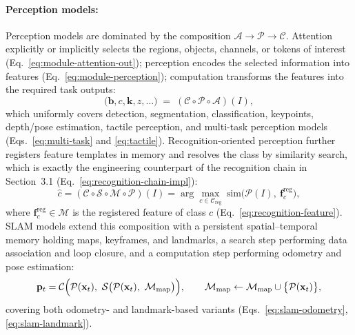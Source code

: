 \documentclass[12pt,a4paper]{article}
\newcommand{\Attn}{\mathcal{A}}
\newcommand{\Per}{\mathcal{P}}
\newcommand{\Mem}{\mathcal{M}}
\newcommand{\Srch}{\mathcal{S}}
\newcommand{\Comp}{\mathcal{C}}
\begin{document}
\paragraph{Perception models:}
Perception models are dominated by the composition $\Attn\to\Per\to\Comp$. Attention explicitly or implicitly selects the regions, objects, channels, or tokens of interest (Eq.~\eqref{eq:module-attention-out}); perception encodes the selected information into features (Eq.~\eqref{eq:module-perception}); computation transforms the features into the required task outputs:
\begin{equation}
\bigl(\mathbf{b},c,\mathbf{k},z,\ldots\bigr)\;=\;(\Comp\circ\Per\circ\Attn)(I),
\label{eq:summary-perception}
\end{equation}
which uniformly covers detection, segmentation, classification, keypoints, depth/pose estimation, tactile perception, and multi-task perception models (Eqs.~\eqref{eq:multi-task} and \eqref{eq:tactile}). Recognition-oriented perception further registers feature templates in memory and resolves the class by similarity search, which is exactly the engineering counterpart of the recognition chain in Section~3.1 (Eq.~\eqref{eq:recognition-chain-impl}):
\begin{equation}
\hat{c}=(\Comp\circ\Srch\circ\Mem\circ\Per)(I)
=\arg\max_{c\in\mathcal{C}_{\mathrm{reg}}}\ \mathrm{sim}\bigl(\Per(I),\ \mathbf{f}_{c}^{\mathrm{reg}}\bigr),
\label{eq:summary-recognition}
\end{equation}
where $\mathbf{f}_{c}^{\mathrm{reg}}\in\Mem$ is the registered feature of class $c$ (Eq.~\eqref{eq:recognition-feature}). SLAM models extend this composition with a persistent spatial--temporal memory holding maps, keyframes, and landmarks, a search step performing data association and loop closure, and a computation step performing odometry and pose estimation:
\begin{equation}
\mathbf{p}_{t}=\Comp\Bigl(\Per(\mathbf{x}_{t}),\ \Srch\bigl(\Per(\mathbf{x}_{t}),\ \Mem_{\mathrm{map}}\bigr)\Bigr),\qquad
\Mem_{\mathrm{map}}\leftarrow\Mem_{\mathrm{map}}\cup\bigl\{\Per(\mathbf{x}_{t})\bigr\},
\label{eq:summary-slam}
\end{equation}
covering both odometry- and landmark-based variants (Eqs.~\eqref{eq:slam-odometry}, \eqref{eq:slam-landmark}).
\end{document}
